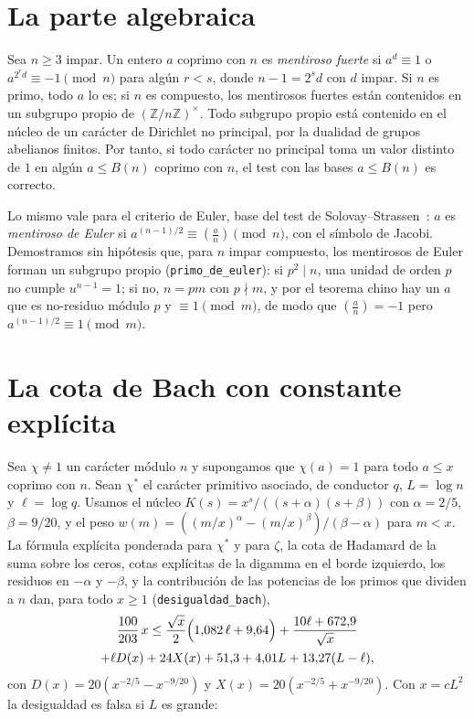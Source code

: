 \documentclass[11pt,a4paper]{amsart}
\theoremstyle{remark}
\newcommand{\Z}{\mathbb{Z}}
\begin{document}
\section{La parte algebraica}

Sea $n\ge3$ impar. Un entero $a$ coprimo con $n$ es \emph{mentiroso fuerte} si $a^d\equiv1$ o $a^{2^rd}\equiv-1\pmod n$ para alg\'un $r<s$, donde $n-1=2^sd$ con $d$ impar. Si $n$ es primo, todo $a$ lo es; si $n$ es compuesto, los mentirosos fuertes est\'an contenidos en un subgrupo propio de $(\Z/n\Z)^\times$. Todo subgrupo propio est\'a contenido en el n\'ucleo de un car\'acter de Dirichlet no principal, por la dualidad de grupos abelianos finitos. Por tanto, si todo car\'acter no principal toma un valor distinto de $1$ en alg\'un $a\le B(n)$ coprimo con $n$, el test con las bases $a\le B(n)$ es correcto.

Lo mismo vale para el criterio de Euler, base del test de Solovay--Strassen~\cite{SS}: $a$ es \emph{mentiroso de Euler} si $a^{(n-1)/2}\equiv\left(\frac an\right)\pmod n$, con el s\'imbolo de Jacobi. Demostramos sin hip\'otesis que, para $n$ impar compuesto, los mentirosos de Euler forman un subgrupo propio (\texttt{primo\_de\_euler}): si $p^2\mid n$, una unidad de orden $p$ no cumple $u^{n-1}=1$; si no, $n=pm$ con $p\nmid m$, y por el teorema chino hay un $a$ que es no-residuo m\'odulo $p$ y $\equiv1\pmod m$, de modo que $\left(\frac an\right)=-1$ pero $a^{(n-1)/2}\equiv1\pmod m$.

\section{La cota de Bach con constante expl\'icita}

Sea $\chi\ne1$ un car\'acter m\'odulo $n$ y supongamos que $\chi(a)=1$ para todo $a\le x$ coprimo con $n$. Sean $\chi^*$ el car\'acter primitivo asociado, de conductor $q$, $L=\log n$ y $\ell=\log q$. Usamos el n\'ucleo $K(s)=x^s/((s+\alpha)(s+\beta))$ con $\alpha=2/5$, $\beta=9/20$, y el peso $w(m)=((m/x)^\alpha-(m/x)^\beta)/(\beta-\alpha)$ para $m<x$. La f\'ormula expl\'icita ponderada para $\chi^*$ y para $\zeta$, la cota de Hadamard de la suma sobre los ceros, cotas expl\'icitas de la digamma en el borde izquierdo, los residuos en $-\alpha$ y $-\beta$, y la contribuci\'on de las potencias de los primos que dividen a $n$ dan, para todo $x\ge1$ (\texttt{desigualdad\_bach}),
\begin{multline*}
\frac{100}{203}\,x\le\frac{\sqrt x}2\Bigl(1{,}082\,\ell+9{,}64\Bigr)+\frac{10\ell+672{,}9}{\sqrt x}\\
+\ell D(x)+24X(x)+51{,}3+4{,}01L+13{,}27(L-\ell),
\end{multline*}
con $D(x)=20(x^{-2/5}-x^{-9/20})$ y $X(x)=20(x^{-2/5}+x^{-9/20})$. Con $x=cL^2$ la desigualdad es falsa si $L$ es grande:
\end{document}
